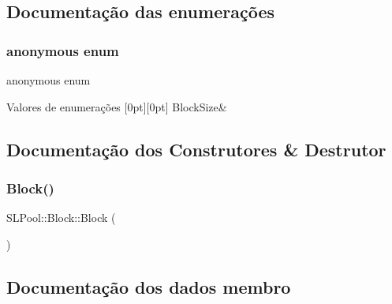 \subsection{Documentação das enumerações}
\mbox{\label{structSLPool_1_1Block_adbb416e65dd0d7aa2121e30b34424db8}} 
\subsubsection{\texorpdfstring{anonymous enum}{anonymous enum}}
{\footnotesize\ttfamily anonymous enum}

\begin{DoxyEnumFields}{Valores de enumerações}
[0pt][0pt]{}\mbox{\label{structSLPool_1_1Block_adbb416e65dd0d7aa2121e30b34424db8a32fd11caed7c39eb5ab3949a612a14b9}} 
Block\+Size&\\
\hline

\end{DoxyEnumFields}


\subsection{Documentação dos Construtores \& Destrutor}
\mbox{\label{structSLPool_1_1Block_a2657816d1a41e84aa7ad25cdcf83ac60}} 
\subsubsection{\texorpdfstring{Block()}{Block()}}
{\footnotesize\ttfamily S\+L\+Pool\+::\+Block\+::\+Block (\begin{DoxyParamCaption}{ }\end{DoxyParamCaption})\hspace{0.3cm}{\ttfamily [inline]}}



\subsection{Documentação dos dados membro}
\mbox{\label{structSLPool_1_1Block_a77176c27d7b62721129f2d2539ec72b5}} 
